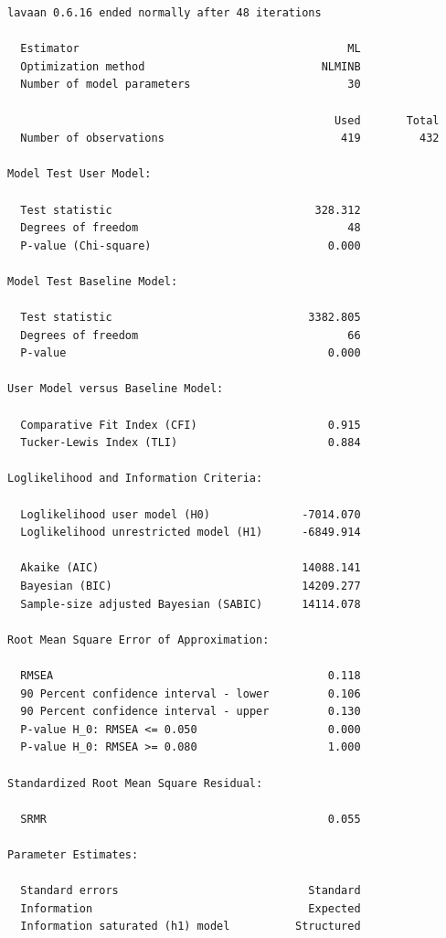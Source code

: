 \documentclass[
  letterpaper,
  DIV=11,
  numbers=noendperiod]{scrreprt}
\begin{document}
\begin{verbatim}
lavaan 0.6.16 ended normally after 48 iterations

  Estimator                                         ML
  Optimization method                           NLMINB
  Number of model parameters                        30

                                                  Used       Total
  Number of observations                           419         432

Model Test User Model:
                                                      
  Test statistic                               328.312
  Degrees of freedom                                48
  P-value (Chi-square)                           0.000

Model Test Baseline Model:

  Test statistic                              3382.805
  Degrees of freedom                                66
  P-value                                        0.000

User Model versus Baseline Model:

  Comparative Fit Index (CFI)                    0.915
  Tucker-Lewis Index (TLI)                       0.884

Loglikelihood and Information Criteria:

  Loglikelihood user model (H0)              -7014.070
  Loglikelihood unrestricted model (H1)      -6849.914
                                                      
  Akaike (AIC)                               14088.141
  Bayesian (BIC)                             14209.277
  Sample-size adjusted Bayesian (SABIC)      14114.078

Root Mean Square Error of Approximation:

  RMSEA                                          0.118
  90 Percent confidence interval - lower         0.106
  90 Percent confidence interval - upper         0.130
  P-value H_0: RMSEA <= 0.050                    0.000
  P-value H_0: RMSEA >= 0.080                    1.000

Standardized Root Mean Square Residual:

  SRMR                                           0.055

Parameter Estimates:

  Standard errors                             Standard
  Information                                 Expected
  Information saturated (h1) model          Structured


\end{verbatim}
\end{document}
